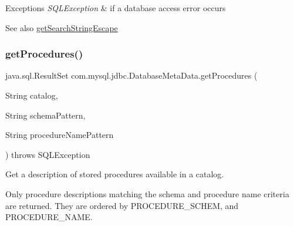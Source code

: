 \begin{DoxyExceptions}{Exceptions}
{\em S\+Q\+L\+Exception} & if a database access error occurs \\
\hline
\end{DoxyExceptions}
\begin{DoxySeeAlso}{See also}
\mbox{\hyperlink{classcom_1_1mysql_1_1jdbc_1_1_database_meta_data_a210b7942557a965c3af550074bb6fe9d}{get\+Search\+String\+Escape}} 
\end{DoxySeeAlso}
\mbox{\label{classcom_1_1mysql_1_1jdbc_1_1_database_meta_data_a622efd6d2cc33569fba43123f4622843}} 
\subsubsection{\texorpdfstring{get\+Procedures()}{getProcedures()}}
{\footnotesize\ttfamily java.\+sql.\+Result\+Set com.\+mysql.\+jdbc.\+Database\+Meta\+Data.\+get\+Procedures (\begin{DoxyParamCaption}\item[{String}]{catalog,  }\item[{String}]{schema\+Pattern,  }\item[{String}]{procedure\+Name\+Pattern }\end{DoxyParamCaption}) throws S\+Q\+L\+Exception}

Get a description of stored procedures available in a catalog. 

Only procedure descriptions matching the schema and procedure name criteria are returned. They are ordered by P\+R\+O\+C\+E\+D\+U\+R\+E\+\_\+\+S\+C\+H\+EM, and P\+R\+O\+C\+E\+D\+U\+R\+E\+\_\+\+N\+A\+ME. 

